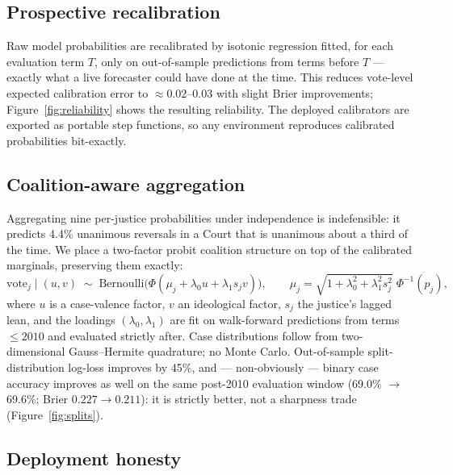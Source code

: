 \documentclass[11pt]{article}
\begin{document}
\subsection{Prospective recalibration}

Raw model probabilities are recalibrated by isotonic regression fitted, for each
evaluation term $T$, only on out-of-sample predictions from terms before $T$ ---
exactly what a live forecaster could have done at the time. This reduces
vote-level expected calibration error to $\approx 0.02$--$0.03$ with slight
Brier improvements; Figure~\ref{fig:reliability} shows the resulting
reliability. The deployed calibrators are exported as portable step functions,
so any environment reproduces calibrated probabilities bit-exactly.

\subsection{Coalition-aware aggregation}\label{sec:coalition}

Aggregating nine per-justice probabilities under independence is indefensible:
it predicts 4.4\% unanimous reversals in a Court that is unanimous about a
third of the time. We place a two-factor probit coalition structure on top of
the calibrated marginals, preserving them exactly:
\begin{equation*}
\text{vote}_j \mid (u, v) \;\sim\;
\mathrm{Bernoulli}\!\big(\Phi(\mu_j + \lambda_0 u + \lambda_1 s_j v)\big),
\qquad
\mu_j = \sqrt{1 + \lambda_0^2 + \lambda_1^2 s_j^2}\;\Phi^{-1}(p_j),
\end{equation*}
where $u$ is a case-valence factor, $v$ an ideological factor, $s_j$ the
justice's lagged lean, and the loadings $(\lambda_0, \lambda_1)$ are fit on
walk-forward predictions from terms $\le 2010$ and evaluated strictly after.
Case distributions follow from two-dimensional Gauss--Hermite quadrature; no
Monte Carlo. Out-of-sample split-distribution log-loss improves by 45\%, and
--- non-obviously --- binary case accuracy improves as well on the same
post-2010 evaluation window (69.0\% $\to$ 69.6\%; Brier $0.227 \to 0.211$):
it is strictly better, not a sharpness trade (Figure~\ref{fig:splits}).

\subsection{Deployment honesty}\label{sec:deployment}
\end{document}
